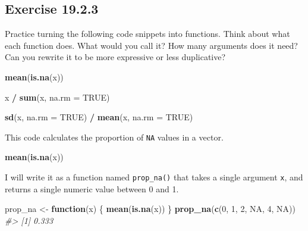 \documentclass[]{book}
\newenvironment{Shaded}{\begin{snugshade}}{\end{snugshade}}
\newcommand{\CommentTok}[1]{\textcolor[rgb]{0.56,0.35,0.01}{\textit{#1}}}
\newcommand{\ControlFlowTok}[1]{\textcolor[rgb]{0.13,0.29,0.53}{\textbf{#1}}}
\newcommand{\DataTypeTok}[1]{\textcolor[rgb]{0.13,0.29,0.53}{#1}}
\newcommand{\DecValTok}[1]{\textcolor[rgb]{0.00,0.00,0.81}{#1}}
\newcommand{\KeywordTok}[1]{\textcolor[rgb]{0.13,0.29,0.53}{\textbf{#1}}}
\newcommand{\NormalTok}[1]{#1}
\newcommand{\OperatorTok}[1]{\textcolor[rgb]{0.81,0.36,0.00}{\textbf{#1}}}
\newcommand{\OtherTok}[1]{\textcolor[rgb]{0.56,0.35,0.01}{#1}}
\newcommand{\StringTok}[1]{\textcolor[rgb]{0.31,0.60,0.02}{#1}}
\theoremstyle{plain}
\theoremstyle{remark}
\begin{document}
\hypertarget{exercise-19.2.3}{%
\subsection*{\texorpdfstring{Exercise
{19.2.3}}{Exercise 19.2.3}}\label{exercise-19.2.3}}

Practice turning the following code snippets into functions. Think about
what each function does. What would you call it? How many arguments does
it need? Can you rewrite it to be more expressive or less duplicative?

\begin{Shaded}
\begin{Highlighting}[]
\KeywordTok{mean}\NormalTok{(}\KeywordTok{is.na}\NormalTok{(x))}

\NormalTok{x }\OperatorTok{/}\StringTok{ }\KeywordTok{sum}\NormalTok{(x, }\DataTypeTok{na.rm =} \OtherTok{TRUE}\NormalTok{)}

\KeywordTok{sd}\NormalTok{(x, }\DataTypeTok{na.rm =} \OtherTok{TRUE}\NormalTok{) }\OperatorTok{/}\StringTok{ }\KeywordTok{mean}\NormalTok{(x, }\DataTypeTok{na.rm =} \OtherTok{TRUE}\NormalTok{)}
\end{Highlighting}
\end{Shaded}

This code calculates the proportion of \texttt{NA} values in a vector.

\begin{Shaded}
\begin{Highlighting}[]
\KeywordTok{mean}\NormalTok{(}\KeywordTok{is.na}\NormalTok{(x))}
\end{Highlighting}
\end{Shaded}

I will write it as a function named \texttt{prop\_na()} that takes a
single argument \texttt{x}, and returns a single numeric value between 0
and 1.

\begin{Shaded}
\begin{Highlighting}[]
\NormalTok{prop_na <-}\StringTok{ }\ControlFlowTok{function}\NormalTok{(x) \{}
  \KeywordTok{mean}\NormalTok{(}\KeywordTok{is.na}\NormalTok{(x))}
\NormalTok{\}}
\KeywordTok{prop_na}\NormalTok{(}\KeywordTok{c}\NormalTok{(}\DecValTok{0}\NormalTok{, }\DecValTok{1}\NormalTok{, }\DecValTok{2}\NormalTok{, }\OtherTok{NA}\NormalTok{, }\DecValTok{4}\NormalTok{, }\OtherTok{NA}\NormalTok{))}
\CommentTok{#> [1] 0.333}
\end{Highlighting}
\end{Shaded}
\end{document}
